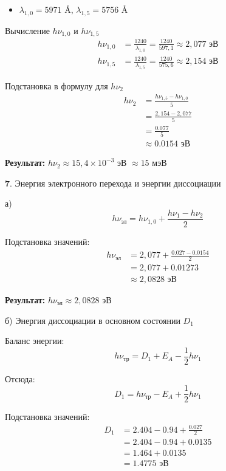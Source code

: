 \documentclass[a4paper]{article}
\begin{document}
\begin{itemize}
    \item $\lambda_{1,0} = 5971$ \AA, \quad $\lambda_{1,5} = 5756$ \AA
\end{itemize}

Вычисление $h\nu_{1,0}$ и $h\nu_{1,5}$
\begin{align}
h\nu_{1,0} &= \frac{1240}{\lambda_{1,0}} = \frac{1240}{597,1} \approx 2,077 \text{ эВ} \\[8pt]
h\nu_{1,5} &= \frac{1240}{\lambda_{1,5}} = \frac{1240}{575,6} \approx 2,154 \text{ эВ}
\end{align}

Подстановка в формулу для $h\nu_2$
\begin{align}
h\nu_2 &= \frac{h\nu_{1,5} - h\nu_{1,0}}{5} \\[8pt]
&= \frac{2,154 - 2,077}{5} \\[8pt]
&= \frac{0.077}{5} \\[8pt]
&\approx 0.0154 \text{ эВ}
\end{align}

\textbf{Результат:} $h\nu_2 \approx 15,4 \times 10^{-3}$ эВ $\approx 15$ мэВ

$\textbf{7.}$ Энергия электронного перехода и энергии диссоциации \par
а)
\[
h\nu_{\text{эл}} = h\nu_{1,0} + \frac{h\nu_1 - h\nu_2}{2}
\]

Подстановка значений:
\begin{align}
h\nu_{\text{эл}} &= 2,077 + \frac{0.027 - 0.0154}{2} \\[8pt]
&= 2,077 + 0.01273 \\[8pt]
&\approx 2,0828 \text{ эВ}
\end{align}

\textbf{Результат:} $h\nu_{\text{эл}} \approx 2,0828$ эВ

б) Энергия диссоциации в основном состоянии $D_{1}$

Баланс энергии:
\[
h\nu_{\text{тр}} = D_1 + E_A - \frac{1}{2} h\nu_1
\]

Отсюда:
\[
D_1 = h\nu_{\text{тр}} - E_A + \frac{1}{2} h\nu_1
\]

Подстановка значений:
\begin{align}
D_1 &= 2.404 - 0.94 + \frac{0.027}{2} \\[8pt]
&= 2.404 - 0.94 + 0.0135 \\[8pt]
&= 1.464 + 0.0135 \\[8pt]
&= 1.4775 \text{ эВ}
\end{align}
\end{document}
